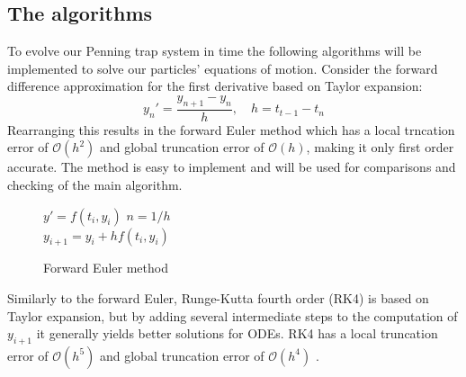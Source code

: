 \documentclass[english,notitlepage,reprint,nofootinbib]{revtex4-1}  %
\begin{document}
\subsection*{The algorithms}
To evolve our Penning trap system in time the following algorithms will be implemented to solve our particles' equations of motion.
Consider the forward difference approximation for the first derivative based on Taylor expansion:
\begin{equation}
    y_n' = \frac{y_{n+1}  - y_n}{h}, \quad h = t_{t-1} -t_n
\end{equation}
Rearranging this results in the forward Euler method which has a local trncation error of $\mathcal{O}(h^2)$ and global truncation error of $\mathcal{O}(h)$,
making it only first order accurate. The method is easy to implement and will be used for comparisons
and checking of the main algorithm.
%
\begin{figure}[H]
    \begin{algorithm}[H]
        \caption{Forward Euler method}
        \label{algo:EUL}
        \begin{algorithmic}
            \State $y' = f(t_i,y_i)$        
            \State $n = 1 / h$ 
            \\
            \State $y_{i+1} = y_i + h f(t_i, y_i)$  
            \EndFor
            \EndProcedure
        \end{algorithmic}
    \end{algorithm}
\end{figure}

Similarly to the forward Euler, Runge-Kutta fourth order (RK4) is based on Taylor expansion, but by adding several intermediate
steps to the computation of $y_{i+1}$ it generally yields better solutions for ODEs. RK4 has a local truncation error of $\mathcal{O}(h^5)$
and global truncation error of $\mathcal{O}(h^4)$ \cite{compendium}.
\end{document}
